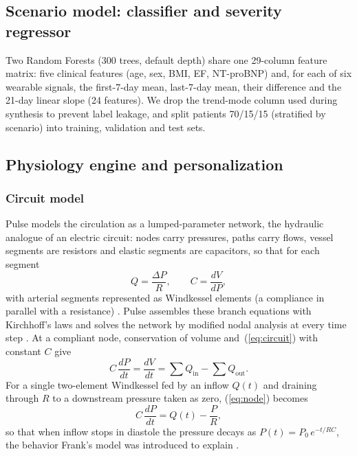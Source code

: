 \documentclass[conference]{IEEEtran}
\begin{document}
\subsection{Scenario model: classifier and severity regressor}
Two Random Forests \cite{breiman2001rf} (300 trees, default depth) share one 29-column feature matrix: five clinical features (age, sex, BMI, EF, NT-proBNP) and, for each of six wearable signals, the first-7-day mean, last-7-day mean, their difference and the 21-day linear slope (24 features). We drop the trend-mode column used during synthesis to prevent label leakage, and split patients 70/15/15 (stratified by scenario) into training, validation and test sets.

\subsection{Physiology engine and personalization}\label{sec:engine}
\subsubsection{Circuit model}
Pulse models the circulation as a lumped-parameter network, the hydraulic analogue of an electric circuit: nodes carry pressures, paths carry flows, vessel segments are resistors and elastic segments are capacitors, so that for each segment
\begin{equation}
Q=\frac{\Delta P}{R},\qquad C=\frac{dV}{dP},
\label{eq:circuit}
\end{equation}
with arterial segments represented as Windkessel elements (a compliance in parallel with a resistance) \cite{pulse_cv_methodology}. Pulse assembles these branch equations with Kirchhoff's laws and solves the network by modified nodal analysis at every time step \cite{pulse_circuit_methodology}. At a compliant node, conservation of volume and~(\ref{eq:circuit}) with constant $C$ give
\begin{equation}
C\,\frac{dP}{dt}=\frac{dV}{dt}=\sum Q_{\text{in}}-\sum Q_{\text{out}}.
\label{eq:node}
\end{equation}
For a single two-element Windkessel fed by an inflow $Q(t)$ and draining through $R$ to a downstream pressure taken as zero, (\ref{eq:node}) becomes
\begin{equation}
C\,\frac{dP}{dt}=Q(t)-\frac{P}{R},
\label{eq:windkessel}
\end{equation}
so that when inflow stops in diastole the pressure decays as $P(t)=P_0\,e^{-t/RC}$, the behavior Frank's model was introduced to explain \cite{westerhof2009windkessel}.
\end{document}
